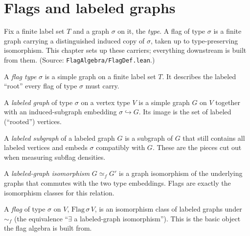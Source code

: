 \chapter{Flags and labeled graphs}
\label{chap:flags}

Fix a finite label set $T$ and a graph $\sigma$ on it, the \emph{type}. A flag of
type $\sigma$ is a finite graph carrying a distinguished induced copy of $\sigma$,
taken up to type-preserving isomorphism. This chapter sets up these carriers;
everything downstream is built from them. (Source: \texttt{FlagAlgebra/FlagDef.lean}.)

\begin{definition}
  \label{def:flag-type}
  \leanok
  A \emph{flag type} $\sigma$ is a simple graph on a finite label set $T$. It
  describes the labeled ``root'' every flag of type $\sigma$ must carry.
\end{definition}

\begin{definition}
  \label{def:labeled-graph}
  \leanok
  A \emph{labeled graph} of type $\sigma$ on a vertex type $V$ is a simple graph
  $G$ on $V$ together with an induced-subgraph embedding
  $\sigma \hookrightarrow G$. Its image is the set of labeled (``rooted'')
  vertices.
\end{definition}

\begin{definition}
  \label{def:labeled-subgraph}
  \leanok
  A \emph{labeled subgraph} of a labeled graph $G$ is a subgraph of $G$ that
  still contains all labeled vertices and embeds $\sigma$ compatibly with $G$.
  These are the pieces cut out when measuring subflag densities.
\end{definition}

\begin{definition}
  \label{def:labeled-graph-iso}
  \leanok
  A \emph{labeled-graph isomorphism} $G \simeq_f G'$ is a graph isomorphism of the
  underlying graphs that commutes with the two type embeddings. Flags are exactly
  the isomorphism classes for this relation.
\end{definition}

\begin{definition}[Flag]
  \label{def:flag}
  \leanok
  A \emph{flag} of type $\sigma$ on $V$, $\mathrm{Flag}\,\sigma\,V$, is an
  isomorphism class of labeled graphs under $\sim_f$ (the equivalence
  ``$\exists$ a labeled-graph isomorphism''). This is the basic object the flag
  algebra is built from.
\end{definition}

